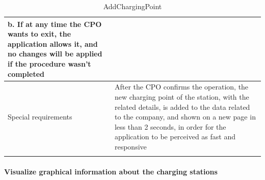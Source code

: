 \begin{center}
\begin{longtable}{p{4cm} p{11cm}}
                    b. If at any time the CPO wants to exit, the application allows it, and no changes will be applied if the procedure wasn't completed \\
     \hline
     Special requirements & After the CPO confirms the operation, the new charging point of the station, with the related details, is added to the data related to the company, and shown on a new page in less than 2 seconds, in order for the application to be perceived as fast and responsive \\
     \hline
    \caption{AddChargingPoint}
    \label{tab:AddChargingPoint}
    \end{longtable}
\end{center}

\paragraph{Visualize graphical information about the charging stations}
